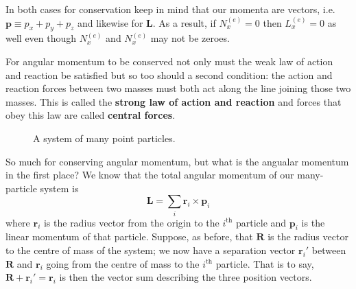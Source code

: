 \documentclass[english,seminar,headertitle]{lecture}
\begin{document}
In both cases for conservation keep in mind that our momenta are vectors, i.e. $\mathbf{p} \equiv p_x + p_y + p_z$ and likewise for $\mathbf{L}$. As a result, if $N_x^{(e)} = 0$ then $L_x^{(e)} = 0$ as well even though $N_x^{(e)}$ and $N_x^{(e)}$ may not be zeroes.

For angular momentum to be conserved not only must the weak law of action and reaction be satisfied but so too should a second condition: the action and reaction forces between two masses must both act along the line joining those two masses. This is called the \textbf{strong law of action and reaction} and forces that obey this law are called \textbf{central forces}.

\begin{figure}
\centering
{}
	\caption{A system of many point particles.}\label{fig:com}
\end{figure}

So much for conserving angular momentum, but what is the angualar momentum in the first place? We know that the total angular momentum of our many-particle system is
\begin{equation}
\mathbf{L} = \sum_i \mathbf{r}_i \times \mathbf{p}_i \label{eq:L-basic}
\end{equation}%
where $\mathbf{r}_i$ is the radius vector from the origin to the $i^\textrm{th}$ particle and $\mathbf{p}_i$ is the linear momentum of that particle. Suppose, as before, that $\mathbf{R}$ is the radius vector to the centre of mass of the system; we now have a separation vector $\mathbf{r}_i'$ between $\mathbf{R}$ and $\mathbf{r}_i$ going from the centre of mass to the $i^\textrm{th}$ particle. That is to say, $\mathbf{R} + \mathbf{r}_i' = \mathbf{r}_i$ is then the vector sum describing the three position vectors.
\end{document}
